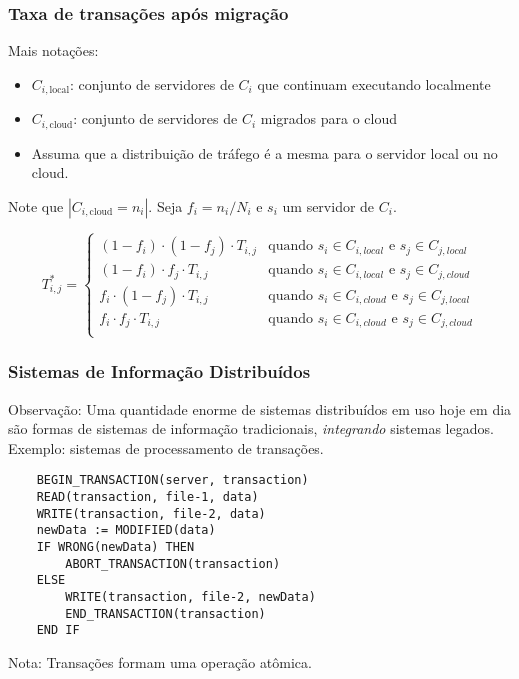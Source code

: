 \documentclass[Ligatures=TeX,table,brazil,svgnames,usetotalslideindicator,compress,10pt]{beamer}
\begin{document}
\begin{frame}
  \frametitle{Taxa de transações após migração}
  \begin{block}{Mais notações:}
    \begin{itemize}
    \item $C_{i,\text{local}}$: conjunto de servidores de $C_i$ que continuam executando localmente
    \item $C_{i,\text{cloud}}$: conjunto de servidores de $C_i$ migrados para o cloud
    \item Assuma que a distribuição de tráfego é a mesma para o servidor local ou no cloud.
    \end{itemize}
    Note que $|C_{i,\text{cloud}} = n_i|$. Seja $f_i = n_i/N_i$ e $s_i$ um servidor de $C_i$.
  \end{block}

      \begin{block}{}
      \[ T^*_{i,j} = 
      \begin{cases}
        (1-f_i) \cdot (1-f_j) \cdot T_{i,j} & \text{quando } s_i \in C_{i,local} \text{ e } s_j \in C_{j,local} \\
        (1-f_i) \cdot f_j \cdot T_{i,j} & \text{quando } s_i \in C_{i,local} \text{ e } s_j \in C_{j,cloud} \\
        f_i \cdot (1-f_j) \cdot T_{i,j} & \text{quando } s_i \in C_{i,cloud} \text{ e } s_j \in C_{j,local} \\
        f_i \cdot f_j \cdot T_{i,j} & \text{quando } s_i \in C_{i,cloud} \text{ e } s_j \in C_{j,cloud} \\
      \end{cases}
      \]
    \end{block}
\end{frame}



\begin{frame}[fragile]
  \frametitle{Sistemas de Informação Distribuídos}
  \begin{block}{Observação:}
    Uma quantidade enorme de sistemas distribuídos em uso hoje em dia são formas de sistemas de informação tradicionais, \emph{integrando} sistemas legados. \alert{Exemplo:} sistemas de processamento de transações.
  \end{block}

  {\scriptsize
  \begin{verbatim}
    BEGIN_TRANSACTION(server, transaction)
    READ(transaction, file-1, data)
    WRITE(transaction, file-2, data)
    newData := MODIFIED(data)
    IF WRONG(newData) THEN  
        ABORT_TRANSACTION(transaction)
    ELSE   
        WRITE(transaction, file-2, newData) 
        END_TRANSACTION(transaction)
    END IF 
  \end{verbatim}}
  
  \begin{alertblock}{Nota:}
    Transações formam uma operação \alert{atômica}.
  \end{alertblock}

\end{frame}
\end{document}
